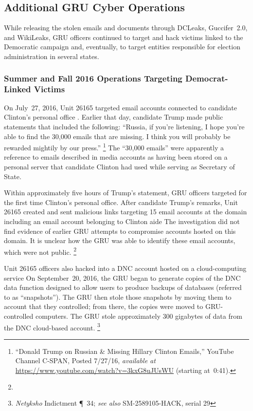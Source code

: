 \subsection{Additional GRU Cyber Operations}

While releasing the stolen emails and documents through DCLeaks, Guccifer~2.0, and WikiLeaks, GRU officers continued to target and hack victims linked to the Democratic campaign and, eventually, to target entities responsible for election administration in several states.

\subsubsection{Summer and Fall 2016 Operations Targeting Democrat-Linked Victims}

On July~27, 2016, Unit 26165 targeted email accounts connected to candidate Clinton's personal office .
Earlier that day, candidate Trump made public statements that included the following: ``Russia, if you're listening, I hope you're able to find the 30,000 emails that are missing.
I think you will probably be rewarded mightily by our press.''%
\footnote{``Donald Trump on Russian \& Missing Hillary Clinton Emails,'' YouTube Channel C-SPAN, Posted 7/27/16, \textit{available at} \url{https://www.youtube.com/watch?v=3kxG8uJUsWU} (starting at~0:41).}
The ``30,000 emails'' were apparently a reference to emails described in media accounts as having been stored on a personal server that candidate Clinton had used while serving as Secretary of State.

Within approximately five hours of Trump's statement, GRU officers targeted for the first time Clinton's personal office.
After candidate Trump's remarks, Unit 26165 created and sent malicious links targeting 15 email accounts at the domain  including an email account belonging to Clinton aide 
The investigation did not find evidence of earlier GRU attempts to compromise accounts hosted on this domain.
It is unclear how the GRU was able to identify these email accounts, which were not public.%
\footnote{}

Unit 26165 officers also hacked into a DNC account hosted on a cloud-computing service 
On September~20, 2016, the GRU began to generate copies of the DNC data  function designed to allow users to produce backups of databases (referred to  as ``snapshots'').
The GRU then stole those snapshots by moving them to  account that they controlled; from there, the copies were moved to GRU-controlled computers.
The GRU stole approximately 300 gigabytes of data from the DNC cloud-based account.%
\footnote{\textit{Netyksho} Indictment \P~34;
\textit{see also} SM-2589105-HACK, serial 29 }

